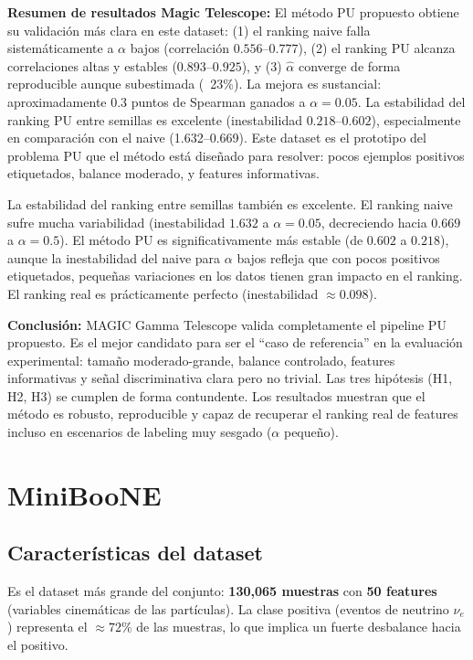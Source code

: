\documentclass[a4paper,11pt]{article}
\begin{document}
\textbf{Resumen de resultados Magic Telescope:} El método PU propuesto obtiene su validación más clara en este dataset: (1) el ranking naive falla sistemáticamente a $\alpha$ bajos (correlación $0.556$--$0.777$), (2) el ranking PU alcanza correlaciones altas y estables ($0.893$--$0.925$), y (3) $\hat{\alpha}$ converge de forma reproducible aunque subestimada (~23\%). La mejora es sustancial: aproximadamente 0.3 puntos de Spearman ganados a $\alpha=0.05$. La estabilidad del ranking PU entre semillas es excelente (inestabilidad $0.218$--$0.602$), especialmente en comparación con el naive (1.632--0.669). Este dataset es el prototipo del problema PU que el método está diseñado para resolver: pocos ejemplos positivos etiquetados, balance moderado, y features informativas.

La estabilidad del ranking entre semillas también es excelente. El ranking naive sufre mucha variabilidad (inestabilidad $1.632$ a $\alpha=0.05$, decreciendo hacia $0.669$ a $\alpha=0.5$). El método PU es significativamente más estable (de $0.602$ a $0.218$), aunque la inestabilidad del naive para $\alpha$ bajos refleja que con pocos positivos etiquetados, pequeñas variaciones en los datos tienen gran impacto en el ranking. El ranking real es prácticamente perfecto (inestabilidad $\approx 0.098$).

\textbf{Conclusión:} MAGIC Gamma Telescope valida completamente el pipeline PU propuesto. Es el mejor candidato para ser el ``caso de referencia'' en la evaluación experimental: tamaño moderado-grande, balance controlado, features informativas y señal discriminativa clara pero no trivial. Las tres hipótesis (H1, H2, H3) se cumplen de forma contundente. Los resultados muestran que el método es robusto, reproducible y capaz de recuperar el ranking real de features incluso en escenarios de labeling muy sesgado ($\alpha$ pequeño).

\section{MiniBooNE}

\subsection{Características del dataset}

Es el dataset más grande del conjunto: \textbf{130{,}065 muestras} con \textbf{50 features} (variables cinemáticas de las partículas). La clase positiva (eventos de neutrino $\nu_e$) representa el $\approx 72\%$ de las muestras, lo que implica un fuerte desbalance hacia el positivo.
\end{document}
